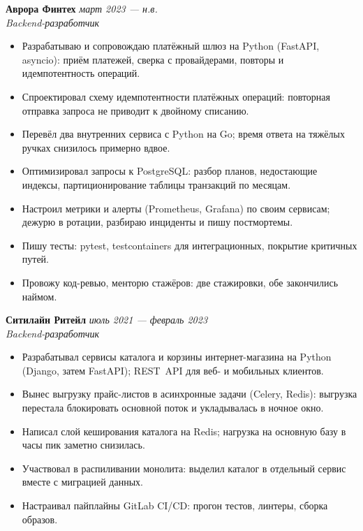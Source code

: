 \documentclass[a4paper,10pt]{article}
\newcommand{\CICD}{\mbox{CI/CD}}
\newcommand{\RESTAPI}{\mbox{REST API}}
\begin{document}
\textbf{Аврора Финтех} \hfill \textit{март 2023 --- н.в.}\\
\textit{Backend-разработчик}
\begin{itemize}
    \item Разрабатываю и сопровождаю платёжный шлюз на Python (FastAPI, asyncio):
          приём платежей, сверка с провайдерами, повторы и идемпотентность операций.
    \item Спроектировал схему идемпотентности платёжных операций: повторная отправка
          запроса не приводит к двойному списанию.
    \item Перевёл два внутренних сервиса с Python на Go; время ответа на тяжёлых
          ручках снизилось примерно вдвое.
    \item Оптимизировал запросы к PostgreSQL: разбор планов, недостающие индексы,
          партиционирование таблицы транзакций по месяцам.
    \item Настроил метрики и алерты (Prometheus, Grafana) по своим сервисам; дежурю
          в ротации, разбираю инциденты и пишу постмортемы.
    \item Пишу тесты: pytest, testcontainers для интеграционных, покрытие критичных путей.
    \item Провожу код-ревью, менторю стажёров: две стажировки, обе закончились наймом.
\end{itemize}

\textbf{Ситилайн Ритейл} \hfill \textit{июль 2021 --- февраль 2023}\\
\textit{Backend-разработчик}
\begin{itemize}
    \item Разрабатывал сервисы каталога и корзины интернет-магазина на Python
          (Django, затем FastAPI); \RESTAPI{} для веб- и мобильных клиентов.
    \item Вынес выгрузку прайс-листов в асинхронные задачи (Celery, Redis): выгрузка
          перестала блокировать основной поток и укладывалась в ночное окно.
    \item Написал слой кеширования каталога на Redis; нагрузка на основную базу
          в часы пик заметно снизилась.
    \item Участвовал в распиливании монолита: выделил каталог в отдельный сервис
          вместе с миграцией данных.
    \item Настраивал пайплайны GitLab \CICD{}: прогон тестов, линтеры, сборка образов.
\end{itemize}
\end{document}
